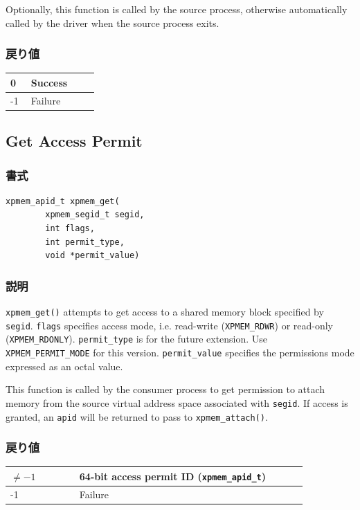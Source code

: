 \documentclass[twoside,11pt,fleqn]{book}
\begin{document}
Optionally, this function is called by the source process, otherwise automatically called
by the driver when the source process exits.

\subsubsection*{戻り値}{\quad}
\begin{table}[!h]
\footnotesize
\begin{tabular}{|p{0.20\linewidth}|p{0.66\linewidth}|} \hline
0&Success\\ \hline
-1&Failure\\ \hline
\end{tabular}
\vspace{-0em}
\end{table}
\FloatBarrier

\subsection{Get Access Permit}
\subsubsection*{書式}{\quad}
\begin{verbatim}
xpmem_apid_t xpmem_get(
        xpmem_segid_t segid,
        int flags,
        int permit_type,
        void *permit_value)
\end{verbatim}

\subsubsection*{説明}{\quad}
\texttt{xpmem\_get()} attempts to get access to a shared memory block specified by \texttt{segid}.
\texttt{flags} specifies access mode, i.e. read-write (\texttt{XPMEM\_RDWR}) or read-only (\texttt{XPMEM\_RDONLY}).
\texttt{permit\_type} is for the future extension. Use \texttt{XPMEM\_PERMIT\_MODE} for this version.
\texttt{permit\_value} specifies the permissions mode expressed as an octal value.

This function is called by the consumer process to get permission to attach memory from
the source virtual address space associated with \texttt{segid}. If access
is granted, an \texttt{apid} will be returned to pass to \texttt{xpmem\_attach()}.

\subsubsection*{戻り値}{\quad}
\begin{table}[!h]
\footnotesize
\begin{tabular}{|p{0.20\linewidth}|p{0.66\linewidth}|} \hline
$\ne -1$&64-bit access permit ID (\texttt{xpmem\_apid\_t})\\ \hline
-1&Failure\\ \hline
\end{tabular}
\vspace{-0em}
\end{table}
\FloatBarrier
\end{document}
